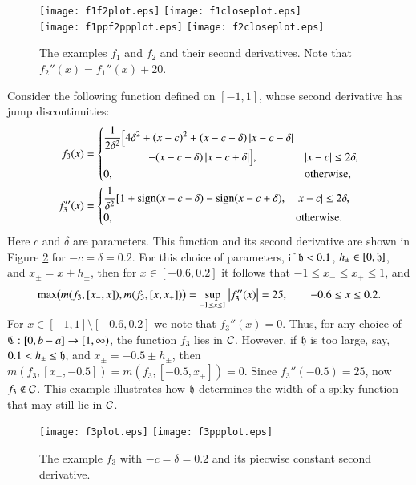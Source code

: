 \documentclass[review]{elsarticle}
\theoremstyle{definition}
\begin{document}
\begin{figure}[t]
\centering
\texttt{[image: f1f2plot.eps]} \quad
\texttt{[image: f1closeplot.eps]} \\
\texttt{[image: f1ppf2ppplot.eps]} \quad
\texttt{[image: f2closeplot.eps]}
\caption{The examples $f_1$ and $f_2$ and their second derivatives. Note that
$f_2''(x) = f_1''(x) + 20$.}
\label{f1f2fig}
\end{figure}

Consider the following function defined on $[-1,1]$, whose second derivative has jump discontinuities:
\begin{align*}
f_3(x) & = \begin{cases} \displaystyle
   \frac{1}{2\delta^2} \Bigl [4 \delta^2 + (x-c)^2 + (x-c-\delta)\left \lvert x-c-\delta \right \rvert
\\ \qquad \qquad
    - (x-c+\delta)\left \lvert x-c+\delta \right \rvert \Bigr ], & \left \lvert x-c \right \rvert \le 2\delta,
\\ 0, & \text{otherwise},
\end{cases} \\
f''_3(x) & =
\begin{cases} \displaystyle
    \frac{1}{\delta^2} [1 + \operatorname{sign}(x-c-\delta) - \operatorname{sign}(x-c+\delta), & \left \lvert x-c \right \rvert \le 2\delta,
\\ 0, & \text{otherwise}.
\end{cases}
\end{align*}
Here $c$ and $\delta$ are parameters. This function and its second derivative
are shown in Figure \ref{f3fig} for $-c=\delta = 0.2$. For this choice of
parameters, if $\mathfrak{h} < 0.1$, $h_\pm \in [0,\mathfrak{h}]$, and $x_\pm = x\pm h_\pm$, then
for $x \in [-0.6, 0.2]$ it follows that $-1 \le x_- \le x_+ \le 1$, and
\[
\max\bigl(m(f_3,[x_-,x]),m(f_3,[x,x_+])\bigr) = \sup_{-1 \le x \le 1} \left \lvert f_3''(x) \right \rvert  = 25, \qquad -0.6 \le x \le 0.2.
\]
For $x \in [-1,1] \setminus [-0.6, 0.2]$ we note that $f_3''(x) = 0$. Thus, for
any choice of $\mathfrak{C} : [0,b-a] \to [1,\infty)$, the function $f_3$ lies in $\mathcal{C}$.
However, if $\mathfrak{h}$ is too large, say, $0.1 < h_\pm \le \mathfrak{h}$, and $x_\pm = -0.5\pm
h_\pm$, then $m(f_3,[x_-,-0.5])=m(f_3,[-0.5,x_+])=0$. Since $f_3''(-0.5) = 25$,
now $f_3 \notin \mathcal{C}$. This example illustrates how $\mathfrak{h}$ determines the width of
a spiky function that may still lie in $\mathcal{C}$.

\begin{figure}[t]
\centering
\texttt{[image: f3plot.eps]} \quad
\texttt{[image: f3ppplot.eps]}
\caption{The example $f_3$ with $-c=\delta = 0.2$  and its piecwise constant second derivative.}
\label{f3fig}
\end{figure}
\end{document}
